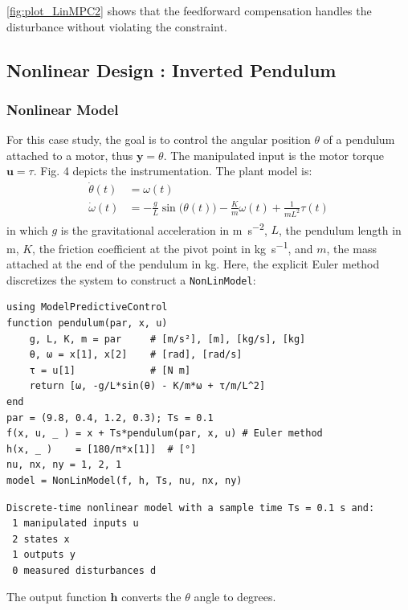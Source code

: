 \cref{fig:plot_LinMPC2} shows that the feedforward compensation handles the disturbance without violating the constraint.

\subsection{Nonlinear Design : Inverted Pendulum}
\label{sec.nonlinear_design}

\subsubsection{Nonlinear Model}

For this case study, the goal is to control the angular position $\theta$ of a pendulum attached to a motor, thus $\mathbf{y} = \theta$. The manipulated input is the motor torque $\mathbf{u} = \tau$. Fig. 4 depicts the instrumentation. The plant model is:
\begin{subequations}
\begin{align}
\dot{\theta}(t) &= \omega(t) \\
\dot{\omega}(t) &= -\frac{g}{L}\sin\big(\theta(t)\big) -\frac{K}{m}\omega(t) + \frac{1}{m L^2}\tau(t) \label{eq.pendulum_speed}
\end{align}
\end{subequations}
in which $g$ is the gravitational acceleration in \si{\meter\per\second\squared}, $L$, the pendulum length in \si{\meter}, $K$, the friction coefficient at the pivot point in \si{\kilogram\per\second}, and $m$, the mass attached at the end of the pendulum in \si{\kilogram}. Here, the explicit Euler method discretizes the system to construct a \texttt{NonLinModel}:
\begin{verbatim}
using ModelPredictiveControl
function pendulum(par, x, u)
    g, L, K, m = par     # [m/s²], [m], [kg/s], [kg]
    θ, ω = x[1], x[2]    # [rad], [rad/s]
    τ = u[1]             # [N m]
    return [ω, -g/L*sin(θ) - K/m*ω + τ/m/L^2]
end
par = (9.8, 0.4, 1.2, 0.3); Ts = 0.1
f(x, u, _ ) = x + Ts*pendulum(par, x, u) # Euler method
h(x, _ )    = [180/π*x[1]]  # [°]
nu, nx, ny = 1, 2, 1
model = NonLinModel(f, h, Ts, nu, nx, ny)
\end{verbatim}
\spacerepl
\begin{verbatim}
Discrete-time nonlinear model with a sample time Ts = 0.1 s and:
 1 manipulated inputs u
 2 states x
 1 outputs y
 0 measured disturbances d
\end{verbatim}
The output function $\mathbf{h}$ converts the $\theta$ angle to degrees.

